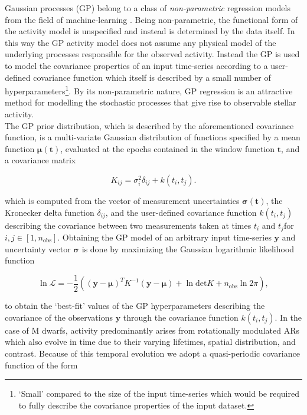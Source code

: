 Gaussian processes (GP) belong to a class of \emph{non-parametric} regression models from the field of machine-learning
\citep{rasmussen05}.
Being non-parametric, the functional form of the activity model is unspecified and instead is determined by the
data itself. In this way the GP activity model does not assume 
any physical model of the underlying processes responsible for the observed activity. Instead the GP is
used to model the covariance properties 
of an input time-series according to a user-defined covariance function which itself is described by a small number
of hyperparameters\footnote{`Small' compared to the size of the input time-series which would be required to fully
  describe the covariance properties of the input dataset.}.
By its non-parametric nature, GP regression is an attractive method for modelling the stochastic processes that give
rise to observable stellar activity. \\

The GP prior distribution, which is described by the aforementioned covariance function,
is a multi-variate Gaussian distribution of functions specified by a mean function
$\boldsymbol{\mu}(\mathbf{t})$, evaluated at the epochs contained in the window function $\mathbf{t}$,
and a covariance matrix

\begin{equation}
  K_{ij} = \sigma_i^2 \delta_{ij} + k(t_i,t_j). \label{BSeq:K}
\end{equation}

\noindent which
is computed from the vector of measurement uncertainties $\boldsymbol{\sigma}(\mathbf{t})$,
the Kronecker delta function $\delta_{ij}$, and
the user-defined covariance function $k(t_i,t_j)$ describing the covariance between two measurements taken at
times $t_i$ and $t_j$for $i,j \in [1,n_{\text{obs}}]$.
Obtaining the GP model of an arbitrary input time-series $\mathbf{y}$ and uncertainty vector
$\boldsymbol{\sigma}$ is done by maximizing the Gaussian logarithmic likelihood function

\begin{equation}
  \ln{\mathcal{L}} = -\frac{1}{2} \left( (\mathbf{y}-\boldsymbol{\mu})^T K^{-1}
  (\mathbf{y}-\boldsymbol{\mu}) + \ln{\mathrm{det} K} + n_{\text{obs}} \ln{2 \pi} \right), \label{BSeq:like}
\end{equation}
  
\noindent to obtain the `best-fit' values of the GP hyperparameters describing the covariance of the observations
$\mathbf{y}$ through the covariance function $k(t_i,t_j)$.
In the case of M dwarfs, activity predominantly arises from rotationally modulated ARs which also
evolve in time due to their varying lifetimes, spatial distribution, and contrast.
Because of this temporal evolution we adopt a quasi-periodic covariance function
of the form

